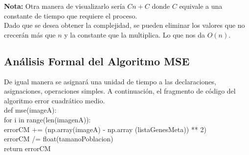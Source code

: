 \documentclass[letterpaper, 10 pt, conference]{ieeeconf}  %
\begin{document}
\indent \textbf{Nota:} Otra manera de visualizarlo ser\'ia  $Cn + C$ donde $C$ equivale a una constante de tiempo que requiere el proceso. \\ 
\indent Dado que se desea obtener la complejidad, se pueden eliminar los valores que no crecer\'an más que $n$ y la constante que la multiplica. Lo que nos da $O(n)$.


\subsection{\textbf{An\'alisis Formal del Algoritmo MSE}}

\indent De igual manera se asignar\'a una unidad de tiempo a las declaraciones, asignaciones, operaciones simples. A continuaci\'on, el fragmento de c\'odigo del algoritmo error cuadr\'atico medio.\\
def mse(imageA):\\
\indent for i in range(len(imagenA)):\\
\indent \indent errorCM += (np.array(imageA) - np.array (listaGenesMeta)) ** 2)\\
\indent errorCM /= float(tamanoPoblacion)\\
\indent return errorCM\\
\end{document}
